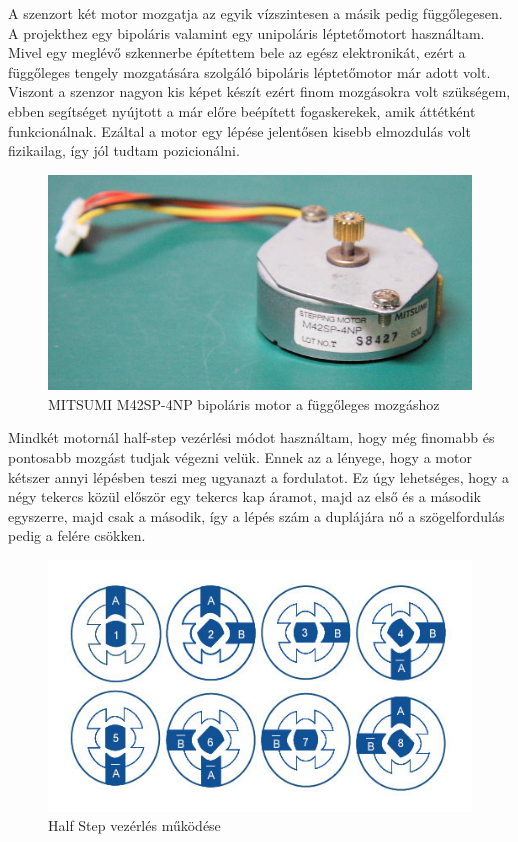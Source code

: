\documentclass[]{thesis-ekf}
\theoremstyle{definition}
\theoremstyle{remark}
\begin{document}
A szenzort két motor mozgatja az egyik vízszintesen a másik pedig függőlegesen. A projekthez egy bipoláris valamint egy unipoláris léptetőmotort\cite{motorvezerlok} használtam. Mivel egy meglévő szkennerbe építettem bele az egész elektronikát, ezért a függőleges tengely mozgatására szolgáló bipoláris léptetőmotor már adott volt. Viszont a szenzor nagyon kis képet készít ezért finom mozgásokra volt szükségem, ebben segítséget nyújtott a már előre beépített fogaskerekek, amik áttétként funkcionálnak. Ezáltal a motor egy lépése jelentősen kisebb elmozdulás volt fizikailag, így jól tudtam pozicionálni. 
\begin{figure}[th!]
	\centering
	\includegraphics[width=0.4\linewidth]{MITSUMI-Stepping-Motor-M42SP-4NP}
	\caption[Mitsumi]{\footnotesize {MITSUMI M42SP-4NP bipoláris motor a függőleges mozgáshoz}}
	\label{fig:mitsumi-stepping-motor-m42sp-4np}
\end{figure}

Mindkét motornál half-step vezérlési módot használtam, hogy még finomabb és pontosabb mozgást tudjak végezni velük. Ennek az a lényege, hogy a motor kétszer annyi lépésben teszi meg ugyanazt a fordulatot. Ez úgy lehetséges, hogy a négy tekercs közül először egy tekercs kap áramot, majd az első és a második egyszerre, majd csak a második, így a lépés szám a duplájára nő a szögelfordulás pedig a felére csökken.

\begin{figure}[th!]
	\centering
	\includegraphics[width=0.5\linewidth]{stepper-motors-half-step}
	\caption[Half Step vezérlés]{Half Step vezérlés működése}
	\label{fig:stepper-motors-half-step}
\end{figure}
\end{document}
